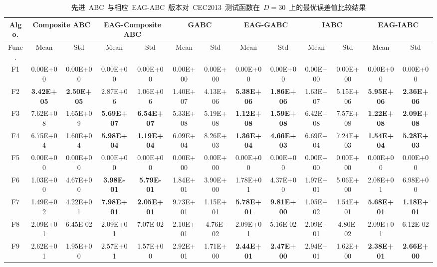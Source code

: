 \begin{table*}[!ht]
  \centering
  \caption{先进~ABC~与相应~EAG-ABC~版本对~CEC2013~测试函数在~$D=30$~上的最优误差值比较结果}
  \tiny
    \begin{tabular}{|c|cc|cc|cc|cc|cc|cc|}
    \hline
    Algo.   & \multicolumn{2}{c|}{Composite ABC} & \multicolumn{2}{c|}{EAG-Composite ABC} & \multicolumn{2}{c|}{ GABC } & \multicolumn{2}{c|}{EAG-GABC} & \multicolumn{2}{c|}{ IABC } & \multicolumn{2}{c|}{EAG-IABC} \\
    \hline
    Func.   & Mean  & Std   & Mean  & Std   &  Mean  &  Std  & Mean  & Std   &  Mean  &  Std  & Mean  & Std \\ \hline
    F1    & 0.00E+00 & 0.00E+00 & 0.00E+00 & 0.00E+00 & 0.00E+00 & 0.00E+00 & 0.00E+00 & 0.00E+00 & 0.00E+00 & 0.00E+00 & 0.00E+00 & 0.00E+00 \\
    F2    & \textbf{3.42E+05} & \textbf{2.50E+05} & 2.87E+06 & 1.06E+06 & 1.40E+07 & 4.13E+06 & \textbf{5.38E+06} & \textbf{1.86E+06} & 1.63E+07 & 5.15E+06 & \textbf{5.95E+06} & \textbf{2.36E+06} \\
    F3    & 7.62E+08 & 1.65E+09 & \textbf{5.69E+07} & \textbf{6.54E+07} & 5.33E+08 & 5.19E+08 & \textbf{1.12E+08} & \textbf{1.59E+08} & 6.42E+08 & 7.57E+08 & \textbf{1.22E+08} & \textbf{2.09E+08} \\
    F4    & 6.75E+04 & 1.60E+04 & \textbf{5.98E+04} & \textbf{1.19E+04} & 6.09E+04 & 8.26E+03 & \textbf{1.36E+04} & \textbf{4.66E+03} & 6.69E+04 & 7.24E+03 & \textbf{1.54E+04} & \textbf{5.28E+03} \\
    F5    & 0.00E+00 & 0.00E+00 & 0.00E+00 & 0.00E+00 & 0.00E+00 & 0.00E+00 & 0.00E+00 & 0.00E+00 & 0.00E+00 & 0.00E+00 & 0.00E+00 & 0.00E+00 \\
    \hline
    F6    & 1.03E+00 & 4.67E+00 & \textbf{3.98E-01} & \textbf{5.79E-01} & 1.84E+01 & 3.90E+00 & 1.78E+01 & 4.37E+00 & 1.97E+01 & 5.06E+00 & 2.08E+01 & 6.98E+00 \\
    F7    & 1.49E+02 & 4.22E+01 & \textbf{7.98E+01} & \textbf{2.05E+01} & 9.73E+01 & 1.15E+01 & \textbf{5.78E+01} & \textbf{9.81E+00} & 1.05E+02 & 1.54E+01 & \textbf{5.68E+01} & \textbf{1.18E+01} \\
    F8    & 2.09E+01 & 6.45E-02 & 2.09E+01 & 7.07E-02 & 2.10E+01 & 4.76E-02 & 2.09E+01 & 5.16E-02 & 2.09E+01 & 4.80E-02 & 2.09E+01 & 6.12E-02 \\
    F9    & 2.62E+01 & 1.95E+00 & 2.57E+01 & 1.57E+00 & 2.92E+01 & 1.71E+00 & \textbf{2.44E+01} & \textbf{2.47E+00} & 2.94E+01 & 1.62E+00 & \textbf{2.38E+01} & \textbf{2.66E+00} \\

\end{tabular}
\end{table*}
